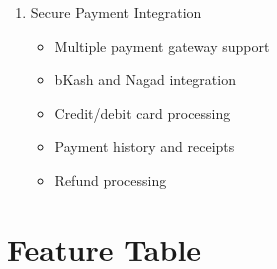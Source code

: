 \documentclass[12pt,a4paper]{report}
\begin{document}
\begin{enumerate}
    \item Secure Payment Integration
    \begin{itemize}
        \item Multiple payment gateway support
        \item bKash and Nagad integration
        \item Credit/debit card processing
        \item Payment history and receipts
        \item Refund processing
    \end{itemize}
\end{enumerate}

\section{Feature Table}
\end{document}
